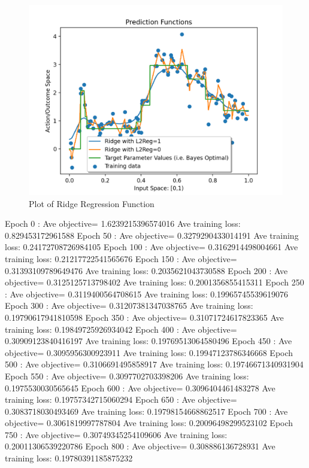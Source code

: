 \documentclass{article}
\theoremstyle{plain}
\theoremstyle{definition}
\begin{document}
\begin{enumerate}
\begin{figure}
    \centering
    \includegraphics[scale=.7]{Ridge Regression plot.png}
    \caption{Plot of Ridge Regression Function}
    \label{fig:ridge plot}
\end{figure}
Epoch  0 : Ave objective= 1.6239215396574016  Ave training loss:  0.829453172961588
Epoch  50 : Ave objective= 0.3279290433014191  Ave training loss:  0.24172708726984105
Epoch  100 : Ave objective= 0.3162914498004661  Ave training loss:  0.21217722541565676
Epoch  150 : Ave objective= 0.31393109789649476  Ave training loss:  0.2035621043730588
Epoch  200 : Ave objective= 0.3125125713798402  Ave training loss:  0.2001356855415311
Epoch  250 : Ave objective= 0.3119400564708615  Ave training loss:  0.19965745539619076
Epoch  300 : Ave objective= 0.31207381347038765  Ave training loss:  0.19790617941810598
Epoch  350 : Ave objective= 0.31071724617823365  Ave training loss:  0.19849725926934042
Epoch  400 : Ave objective= 0.30909123840416197  Ave training loss:  0.19769513064580496
Epoch  450 : Ave objective= 0.3095956300923911  Ave training loss:  0.19947123786346668
Epoch  500 : Ave objective= 0.3106691495858917  Ave training loss:  0.19746671340931904
Epoch  550 : Ave objective= 0.3097702703398206  Ave training loss:  0.1975530030565645
Epoch  600 : Ave objective= 0.3096404461483278  Ave training loss:  0.19757342715060294
Epoch  650 : Ave objective= 0.3083718030493469  Ave training loss:  0.19798154668862517
Epoch  700 : Ave objective= 0.3061819997787804  Ave training loss:  0.20096498299523102
Epoch  750 : Ave objective= 0.30749345254109606  Ave training loss:  0.20011306539220786
Epoch  800 : Ave objective= 0.308886136728931  Ave training loss:  0.19780391185875232

\end{enumerate}
\end{document}
